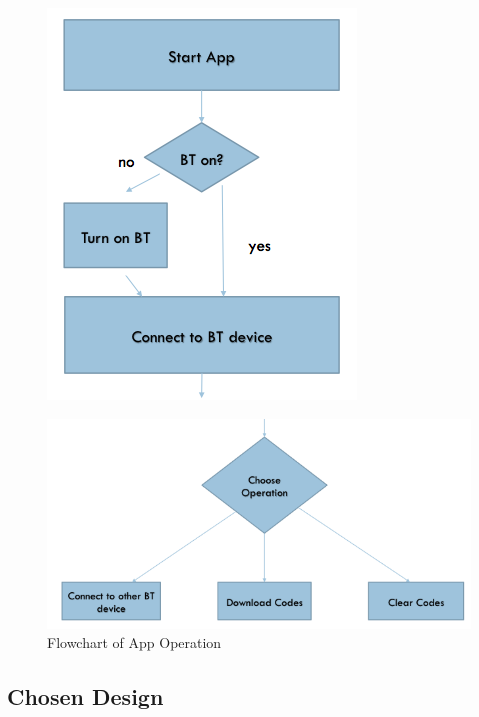 \documentclass[12pt,letterpaper]{article}
\begin{document}
\begin{figure}[H]
\centering
\includegraphics[page=1, totalheight=10cm]{images/flowchart_part1.png}
\label{fig:flowchart1}
\end{figure}

\begin{figure}[H]
\centering
\includegraphics[page=1, totalheight=7cm]{images/flowchart_part2.png}
\caption{Flowchart of App Operation}
\label{fig:flowchart2}
\end{figure}

\subsection{Chosen Design}
\end{document}
